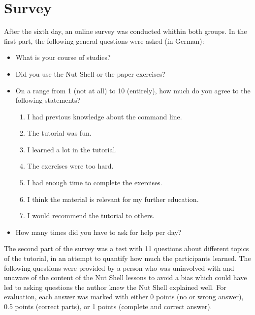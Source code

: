 \documentclass[paper=a4,twoside,abstract=on,cleardoublepage=empty,numbers=noenddot,toc=bib,toc=listof,12pt,appendixprefix=true]{scrreprt}
\begin{document}
\section{Survey}

After the sixth day, an online survey was conducted whithin both groups. In the first part, the following general questions were asked (in German):

\begin{itemize}
    \item What is your course of studies?
    \item Did you use the Nut Shell or the paper exercises?
    \item On a range from 1 (not at all) to 10 (entirely), how much do you agree to the following statements?
        \begin{enumerate}
            \item I had previous knowledge about the command line.
            \item The tutorial was fun.
            \item I learned a lot in the tutorial.
            \item The exercises were too hard.
            \item I had enough time to complete the exercises.
            \item I think the material is relevant for my further education.
            \item I would recommend the tutorial to others.
        \end{enumerate}
    \item How many times did you have to ask for help per day?
\end{itemize}

The second part of the survey was a test with 11 questions about different topics of the tutorial, in an attempt to quantify how much the participants learned. The following questions were provided by a person who was uninvolved with and unaware of the content of the Nut Shell lessons to avoid a bias which could have led to asking questions the author knew the Nut Shell explained well. For evaluation, each answer was marked with either 0 points (no or wrong answer), 0.5 points (correct parts), or 1 points (complete and correct answer).
\end{document}
